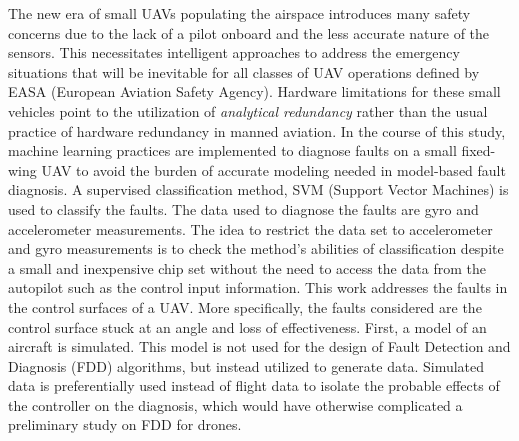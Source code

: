 % 
% 
%

The new era of small UAVs populating the airspace introduces many safety concerns due to the lack of a pilot onboard and the less accurate nature of the sensors. 
This necessitates intelligent approaches to address the emergency situations that will be inevitable for all classes of UAV operations defined by EASA (European Aviation Safety Agency). 
Hardware limitations for these small vehicles point to the utilization of \emph{analytical redundancy} rather than the usual practice of hardware redundancy in manned aviation. 
In the course of this study, machine learning practices are implemented to diagnose faults on a small fixed-wing UAV to avoid the burden of accurate modeling needed in model-based fault diagnosis. 
A supervised classification method, SVM (Support Vector Machines) is used to classify the faults. 
The data used to diagnose the faults are gyro and accelerometer measurements. 
The idea to restrict the data set to accelerometer and gyro measurements is to check the method's abilities of classification despite a small and inexpensive chip set without the need to access the data from the autopilot such as the control input information. 
This work addresses the faults in the control surfaces of a UAV. 
More specifically, the faults considered are the control surface stuck at an angle and loss of effectiveness. 
First, a model of an aircraft is simulated. This model is not used for the design of Fault Detection and Diagnosis (FDD) algorithms, but instead utilized to generate data. 
Simulated data is preferentially used instead of flight data to isolate the probable effects of the controller on the diagnosis, which would have otherwise complicated a preliminary study on FDD for drones.
